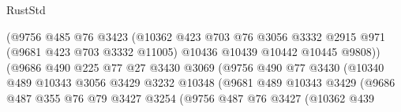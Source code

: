 \begin{lexlean}{RustStd}
\begin{coremodule}
                                      (@9756
                                        @485
                                        @76
                                        @3423
                                        (@10362
                                          @423
                                          @703
                                          @76
                                          @3056
                                          @3332
                                          @2915
                                          @971
                                          (@9681 @423 @703 @3332 @11005)
                                          @10436
                                          @10439
                                          @10442
                                          @10445
                                          @9808))
                                      (@9686
                                        @490
                                        @225
                                        @77
                                        @27
                                        @3430
                                        @3069
                                        (@9756
                                          @490
                                          @77
                                          @3430
                                          (@10340
                                            @489
                                            @10343
                                            @3056
                                            @3429
                                            @3232
                                            @10348
                                            (@9681
                                              @489
                                              @10343
                                              @3429
                                              (@9686
                                                @487
                                                @355
                                                @76
                                                @79
                                                @3427
                                                @3254
                                                (@9756
                                                  @487
                                                  @76
                                                  @3427
                                                  (@10362
                                                    @439

\end{coremodule}
\end{lexlean}
